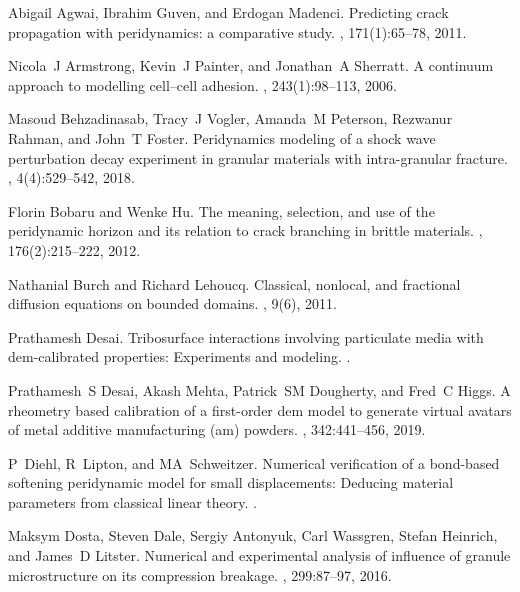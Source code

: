 \documentclass[11pt,twocolumn]{amsart}
\theoremstyle{definition}
\theoremstyle{definition}
\numberwithin{equation}{section}
\numberwithin{equation}{section}
\begin{document}
\newcommand{\noopsort}[1]{}
\begin{thebibliography}{10}
	
	Abigail Agwai, Ibrahim Guven, and Erdogan Madenci.
	\newblock Predicting crack propagation with peridynamics: a comparative study.
	, 171(1):65--78, 2011.
	
	Nicola~J Armstrong, Kevin~J Painter, and Jonathan~A Sherratt.
	\newblock A continuum approach to modelling cell--cell adhesion.
	, 243(1):98--113, 2006.
	
	Masoud Behzadinasab, Tracy~J Vogler, Amanda~M Peterson, Rezwanur Rahman, and
	John~T Foster.
	\newblock Peridynamics modeling of a shock wave perturbation decay experiment
	in granular materials with intra-granular fracture.
	, 4(4):529--542, 2018.
	
	Florin Bobaru and Wenke Hu.
	\newblock The meaning, selection, and use of the peridynamic horizon and its
	relation to crack branching in brittle materials.
	, 176(2):215--222, 2012.
	
	Nathanial Burch and Richard Lehoucq.
	\newblock Classical, nonlocal, and fractional diffusion equations on bounded
	domains.
	,
	9(6), 2011.
	
	Prathamesh Desai.
	\newblock Tribosurface interactions involving particulate media with
	dem-calibrated properties: Experiments and modeling.
	.
	
	Prathamesh~S Desai, Akash Mehta, Patrick~SM Dougherty, and Fred~C Higgs.
	\newblock A rheometry based calibration of a first-order dem model to generate
	virtual avatars of metal additive manufacturing (am) powders.
	, 342:441--456, 2019.
	
	P~Diehl, R~Lipton, and MA~Schweitzer.
	\newblock Numerical verification of a bond-based softening peridynamic model
	for small displacements: Deducing material parameters from classical linear
	theory.
	.
	
	Maksym Dosta, Steven Dale, Sergiy Antonyuk, Carl Wassgren, Stefan Heinrich, and
	James~D Litster.
	\newblock Numerical and experimental analysis of influence of granule
	microstructure on its compression breakage.
	, 299:87--97, 2016.
	

\end{thebibliography}
\end{document}
